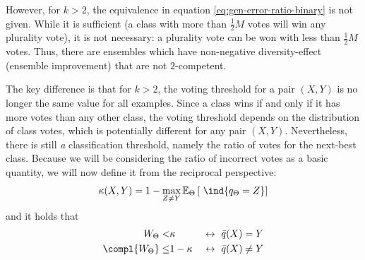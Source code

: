 \documentclass[../main.tex]{subfiles}
\begin{document}
However, for $k>2$, the equivalence in equation \ref{eq:gen-error-ratio-binary} is not given. While it is sufficient (a class with more than $\frac{1}{2}M$ votes will win any plurality vote), it is not necessary: a plurality vote can be won with less than $\frac{1}{2}M$ votes. Thus, there are ensembles which have non-negative diversity-effect (ensemble improvement) that are not $2$-competent. %

The key difference is that for $k>2$, the voting threshold for a pair $(X,Y)$ is no longer the same value for all examples. Since a class wins if and only if it has more votes than any other class, the voting threshold depends on the distribution of class votes, which is potentially different for any pair $(X,Y)$. Nevertheless, there is still \textit{a} classification threshold, namely the ratio of votes for the next-best class. Because we will be considering the ratio of incorrect votes as a basic quantity, we will now define it from the reciprocal perspective:
$$
\kappa (X,Y) = 1 - \max_{Z \not= Y} \mathbb{E}_{\Theta}\left[ ~\ind{q_{\Theta} = Z} \right] 
$$
and it holds that
$$
\begin{align}
W_{\Theta} <& \kappa  & ~\leftrightarrow~ \bar{q}(X) = Y \\ 
\compl{W_{\Theta}} \leq& 1-\kappa  & ~\leftrightarrow~ \bar{q}(X) \not= Y
\end{align}
$$
\end{document}
